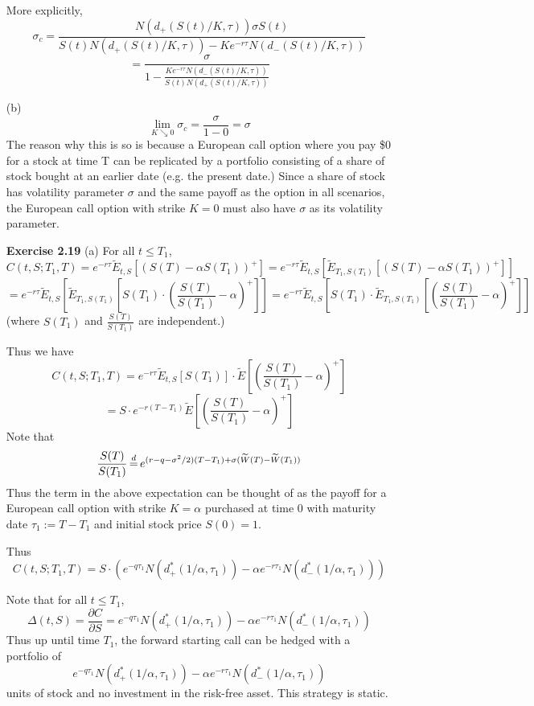 \documentclass{article}[12pt,a4paper]
\begin{document}
\begin{enumerate}
  More explicitly, 
  $$\sigma_c = \frac{N(d_+(S(t)/K,\tau))\sigma S(t)}{S(t)N(d_+(S(t)/K,\tau)) - Ke^{-r\tau}N(d_-(S(t)/K,\tau))}$$ 
  $$= \frac{\sigma}{1 - \frac{Ke^{-r\tau}N(d_-(S(t)/K,\tau))}{S(t)N(d_+(S(t)/K,\tau))}}$$\newline
  
  (b)
  $$\lim_{K \searrow 0}{\sigma_c} = \frac{\sigma}{1 - 0} = \sigma$$
  The reason why this is so is because a European call option where you pay \$$0$ for a stock at time T
  can be replicated by a portfolio consisting of a share of stock bought at an earlier date 
  (e.g. the present date.) Since a share of stock has volatility parameter $\sigma$ and the same payoff
  as the option in all scenarios, the European call option with strike $K = 0$ must also have 
  $\sigma$ as its volatility parameter.
   
  \pagebreak
  \item[\textbf{Exercise 2.19}]
  (a)
   For all $t \le T_1$,
   $$C(t, S; T_1, T) = e^{-r\tau} \widetilde{E}_{t, S}\left[ (S(T) - \alpha S(T_1))^+ \right]
    = e^{-r\tau} \widetilde{E}_{t, S}\left[ \widetilde{E}_{T_1, S(T_1)}\left[ (S(T) - \alpha S(T_1))^+ \right] \right]$$
    $$= e^{-r\tau} \widetilde{E}_{t, S}\left[ \widetilde{E}_{T_1, S(T_1)}\left[S(T_1) \cdot 
        (\frac{S(T)}{S(T_1)} - \alpha)^+ \right] \right]
        = e^{-r\tau} \widetilde{E}_{t, S}\left[ S(T_1) \cdot \widetilde{E}_{T_1, S(T_1)}\left[
        (\frac{S(T)}{S(T_1)} - \alpha)^+ \right] \right]$$
        \hfill (where $S(T_1)$ and $\frac{S(T)}{S(T_1)}$ are independent.) 
        
        Thus we have
        $$C(t, S; T_1, T) = e^{-r\tau} \widetilde{E}_{t, S}\left[ S(T_1) \right] \cdot \widetilde{E}\left[
        (\frac{S(T)}{S(T_1)} - \alpha)^+ \right]$$
        $$= S \cdot e^{-r(T - T_1)}\widetilde{E}\left[(\frac{S(T)}{S(T_1)} - \alpha)^+ \right]$$
        Note that
        $$\frac{S(T)}{S(T_1)} \,{\buildrel d \over =}\, e^{(r - q - \sigma^2/2)(T - T_1) + 
            \sigma(\widetilde{W}(T) - \widetilde{W}(T_1))} $$
       Thus the term in the above expectation can be thought of as the payoff for a European call option 
       with strike $K = \alpha$ purchased at time $0$ with maturity date $\tau_1 := T - T_1$ and initial
       stock price $S(0) = 1$.
       
       Thus
        $$C(t, S; T_1, T) = S \cdot (e^{-q\tau_1}N(d_+^*(1/\alpha, \tau_1)) -
        \alpha e^{-r\tau_1} N(d_-^*(1/\alpha, \tau_1)))$$ 
        
        Note that for all $t \le T_1$,
        $$\Delta(t, S) = \frac{\partial C}{\partial S} = e^{-q\tau_1}N(d_+^*(1/\alpha, \tau_1)) -
        \alpha e^{-r\tau_1} N(d_-^*(1/\alpha, \tau_1))$$
        Thus up until time $T_1$, the forward starting call can be hedged with a portfolio of 
        $$e^{-q\tau_1}N(d_+^*(1/\alpha, \tau_1)) - \alpha e^{-r\tau_1} N(d_-^*(1/\alpha, \tau_1))$$
        units of stock and no investment in the risk-free asset. This strategy is static. \newline
   

\end{enumerate}
\end{document}
